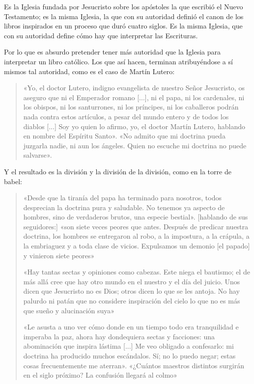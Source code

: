 \documentclass{article}
\begin{document}
\noindent
Es la Iglesia fundada por Jesucristo sobre los apóstoles la que escribió el Nuevo Testamento; es la misma Iglesia, la que con su autoridad definió el canon de los libros inspirados en un proceso que duró cuatro siglos. Es la misma Iglesia, que con su autoridad define cómo hay que interpretar las Escrituras.

Por lo que es absurdo pretender tener más autoridad que la Iglesia para interpretar un libro católico. Los que así hacen, terminan atribuyéndose a sí mismos tal autoridad, como es el caso de Martín Lutero:

\begin{quote}
«Yo, el doctor Lutero, indigno evangelista de nuestro Señor Jesucristo, os aseguro que ni el Emperador romano [...], ni el papa, ni los cardenales, ni los obispos, ni los santurrones, ni los príncipes, ni los caballeros podrán nada contra estos artículos, a pesar del mundo entero y de todos los diablos [...] Soy yo quien lo afirmo, yo, el doctor Martín Lutero, hablando en nombre del Espíritu Santo». «No admito que mi doctrina pueda juzgarla nadie, ni aun los ángeles. Quien no escuche mi doctrina no puede salvarse».
\end{quote}

\noindent
Y el resultado es la división y la división de la división, como en la torre de babel:

\begin{quote}
«Desde que la tiranía del papa ha terminado para nosotros, todos desprecian la doctrina pura y saludable. No tenemos ya aspecto de hombres, sino de verdaderos brutos, una especie bestial». [hablando de sus seguidores:] «son siete veces peores que antes. Después de predicar nuestra doctrina, los hombres se entregaron al robo, a la impostura, a la crápula, a la embriaguez y a toda clase de vicios. Expulsamos un demonio [el papado] y vinieron siete peores»

«Hay tantas sectas y opiniones como cabezas. Este niega el bautismo; el de más allá cree que hay otro mundo en el nuestro y el día del juicio. Unos dicen que Jesucristo no es Dios; otros dicen lo que se les antoja. No hay palurdo ni patán que no considere inspiración del cielo lo que no es más que sueño y alucinación suya»
 
«Le asusta a uno ver cómo donde en un tiempo todo era tranquilidad e imperaba la paz, ahora hay dondequiera sectas y facciones: una abominación que inspira lástima [...] Me veo obligado a confesarlo: mi doctrina ha producido muchos escándalos. Sí; no lo puedo negar; estas cosas frecuentemente me aterran». «¿Cuántos maestros distintos surgirán en el siglo próximo? La confusión llegará al colmo»
\end{quote}
\end{document}
